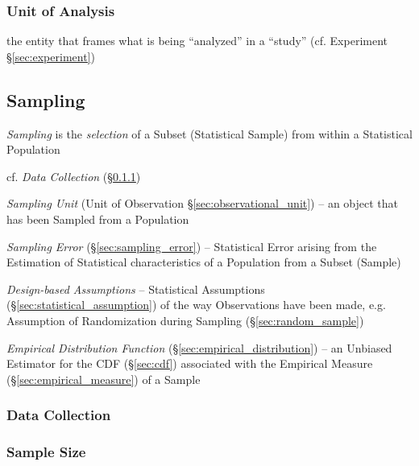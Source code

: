 \subsubsection{Unit of Analysis}\label{sec:analysis_unit}

the entity that frames what is being ``analyzed'' in a ``study'' (cf. Experiment
\S\ref{sec:experiment})



\subsection{Sampling}\label{sec:sampling}

\emph{Sampling} is the \emph{selection} of a Subset (Statistical Sample) from
within a Statistical Population

\fist cf. \emph{Data Collection} (\S\ref{sec:data_collection})

\fist \emph{Sampling Unit} (Unit of Observation \S\ref{sec:observational_unit})
-- an object that has been Sampled from a Population

\fist \emph{Sampling Error} (\S\ref{sec:sampling_error}) -- Statistical Error
arising from the Estimation of Statistical characteristics of a Population from
a Subset (Sample)

\fist \emph{Design-based Assumptions} -- Statistical Assumptions
(\S\ref{sec:statistical_assumption}) of the way Observations have been made,
e.g. Assumption of Randomization during Sampling (\S\ref{sec:random_sample})

\emph{Empirical Distribution Function} (\S\ref{sec:empirical_distribution}) --
an Unbiased Estimator for the CDF (\S\ref{sec:cdf}) associated with the
Empirical Measure (\S\ref{sec:empirical_measure}) of a Sample



\subsubsection{Data Collection}\label{sec:data_collection}




\subsubsection{Sample Size}\label{sec:sample_size}

